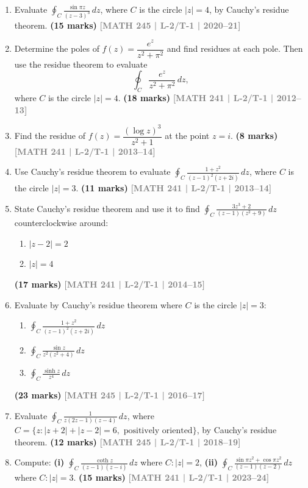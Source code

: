 \documentclass[12pt,a4paper]{article}
\newcommand{\yr}[1]{\hfill\textcolor{gray}{\small\textbf{[#1]}}}
\newcommand{\mk}[1]{\textcolor{orange!70!black}{\small\textbf{(#1 marks)}}}
\begin{document}
\begin{enumerate}

\item Evaluate $\displaystyle\oint_{C} \frac{\sin\pi z}{(z-3)^{3}}\,dz$, where $C$ is the circle $|z|=4$, by Cauchy's residue theorem.
\mk{15} \yr{MATH 245 | L-2/T-1 | 2020--21}

\item Determine the poles of $f(z)=\dfrac{e^{z}}{z^{2}+\pi^{2}}$ and find residues at each pole. Then use the residue theorem to evaluate
\[
\oint_{C} \frac{e^{z}}{z^{2}+\pi^{2}}\,dz,
\]
where $C$ is the circle $|z|=4$.
\mk{18} \yr{MATH 241 | L-2/T-1 | 2012--13}

\item Find the residue of $f(z)=\dfrac{(\log z)^{3}}{z^{2}+1}$ at the point $z=i$.
\mk{8} \yr{MATH 241 | L-2/T-1 | 2013--14}

\item Use Cauchy's residue theorem to evaluate $\displaystyle\oint_{C}\frac{1+z^{2}}{(z-1)^{2}(z+2i)}\,dz$, where $C$ is the circle $|z|=3$.
\mk{11} \yr{MATH 241 | L-2/T-1 | 2013--14}

\item State Cauchy's residue theorem and use it to find $\displaystyle\oint_{C}\frac{3z^{3}+2}{(z-1)(z^{2}+9)}\,dz$ counterclockwise around:
\begin{enumerate}
  \item $|z-2|=2$
  \item $|z|=4$
\end{enumerate}
\mk{17} \yr{MATH 241 | L-2/T-1 | 2014--15}

\item Evaluate by Cauchy's residue theorem where $C$ is the circle $|z|=3$:
\begin{enumerate}
  \item $\displaystyle\oint_{C}\frac{1+z^{2}}{(z-1)^{2}(z+2i)}\,dz$
  \item $\displaystyle\oint_{C}\frac{\sin z}{z^{2}(z^{2}+4)}\,dz$
  \item $\displaystyle\oint_{C}\frac{\sinh z}{z^{4}}\,dz$
\end{enumerate}
\mk{23} \yr{MATH 245 | L-2/T-1 | 2016--17}

\item Evaluate $\displaystyle\oint_{C}\frac{1}{z(2z-1)(z-4)}\,dz$, where $C=\{z:|z+2|+|z-2|=6,\text{ positively oriented}\}$, by Cauchy's residue theorem.
\mk{12} \yr{MATH 245 | L-2/T-1 | 2018--19}

\item Compute: \textbf{(i)} $\displaystyle\oint_{C}\frac{\coth z}{(z-1)(z-i)}\,dz$ where $C:|z|=2$, \quad \textbf{(ii)} $\displaystyle\oint_{C}\frac{\sin\pi z^{2}+\cos\pi z^{2}}{(z-1)(z-2)}\,dz$ where $C:|z|=3$.
\mk{15} \yr{MATH 241 | L-2/T-1 | 2023--24}


\end{enumerate}
\end{document}
